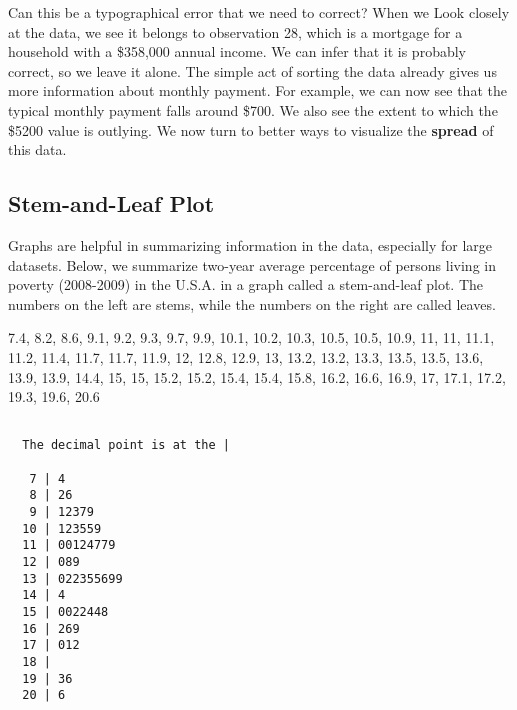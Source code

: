 \documentclass[11pt]{book}\usepackage[]{graphicx}\usepackage[]{color}
\begin{document}

Can this be a typographical error that we need to correct?  When we Look closely at the data, we see it belongs to observation 28, which is a mortgage for a household with a \$358,000 annual income.  We can infer that it is probably correct, so we leave it alone. The simple act of sorting the data already gives us more information about monthly payment.  For example, we can now see that the typical monthly payment falls around \$700.  We also see the extent to which the \$5200 value is outlying. We now turn to better ways to visualize the \textbf{spread} of this data.

\subsection{Stem-and-Leaf Plot}




Graphs are helpful in summarizing information in the data, especially for large datasets.  Below, we summarize two-year average percentage of persons living in poverty (2008-2009) in the U.S.A. in a graph called a stem-and-leaf plot.  The numbers on the left are stems, while the numbers on the right are called leaves.


\begin{minipage}[ht]{7cm}

{\small{


7.4, 8.2, 8.6, 9.1, 9.2, 9.3, 9.7, 9.9, 10.1, 10.2, 10.3, 10.5, 10.5, 10.9, 11, 11, 11.1, 11.2, 11.4, 11.7, 11.7, 11.9, 12, 12.8, 12.9, 13, 13.2, 13.2, 13.3, 13.5, 13.5, 13.6, 13.9, 13.9, 14.4, 15, 15, 15.2, 15.2, 15.4, 15.4, 15.8, 16.2, 16.6, 16.9, 17, 17.1, 17.2, 19.3, 19.6, 20.6
}}
\end{minipage} %
\begin{minipage}[ht]{7cm}

{\small{
\begin{verbatim}

  The decimal point is at the |

   7 | 4
   8 | 26
   9 | 12379
  10 | 123559
  11 | 00124779
  12 | 089
  13 | 022355699
  14 | 4
  15 | 0022448
  16 | 269
  17 | 012
  18 | 
  19 | 36
  20 | 6


\end{verbatim}
}}
\end{minipage}
\end{document}
